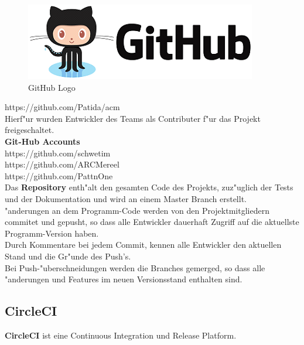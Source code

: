 \documentclass[a4paper, 11pt]{scrreprt}
\begin{document}
\begin{figure} [H]
\begin{center}
\includegraphics[scale=0.7]{github.png}
\caption{GitHub Logo}
\label{github}
\end{center}
\end{figure}

https://github.com/Patida/acm \\

Hierf"ur wurden Entwickler des Teams als Contributer f"ur das Projekt freigeschaltet. \\

\textbf{Git-Hub Accounts} \\
https://github.com/schwetim \\
https://github.com/ARCMereel \\
https://github.com/PattnOne \\


Das \textbf{Repository} enth"alt den gesamten Code des Projekts, zuz"uglich der Tests und der Dokumentation und wird an einem Master Branch erstellt. \\
"anderungen an dem Programm-Code werden von den Projektmitgliedern commitet und gepusht, so dass alle Entwickler dauerhaft Zugriff auf die aktuellste Programm-Version haben. \\

Durch Kommentare bei jedem Commit, kennen alle Entwickler den aktuellen Stand und die Gr"unde des Push’s.  \\
Bei Push-"uberschneidungen werden die Branches gemerged, so dass alle "anderungen und Features im neuen Versionsstand enthalten sind. \\


\subsection{CircleCI}
\textbf{CircleCI} ist eine Continuous Integration und Release Platform. \\
\end{document}
